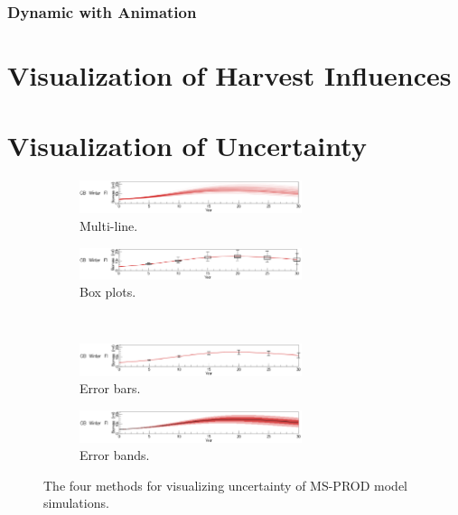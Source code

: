 \subsubsection{Dynamic with Animation}



\section{Visualization of Harvest Influences}



\section{Visualization of Uncertainty}

\begin{figure}
\centering
	\begin{subfigure}[b]{0.45\textwidth}
		\centering
		\includegraphics[width=6.5cm]{figures/eps/msprod_uncertainty_multline.eps}
		\caption{Multi-line.}
		\label{fig:uncertaintyStreak}
	\end{subfigure}	
	\begin{subfigure}[b]{0.45\textwidth}
		\centering
		\includegraphics[width=6.5cm]{figures/eps/msprod_uncertainty_boxplots.eps}
		\caption{Box plots.}
		\label{fig:uncertaintyBoxplots}
	\end{subfigure} \\
	\begin{subfigure}[b]{0.45\textwidth}
		\centering
		\includegraphics[width=6.5cm]{figures/eps/msprod_uncertainty_errorbar.eps}
		\caption{Error bars.}
		\label{fig:uncertaintyErrorbars}
	\end{subfigure}
	\begin{subfigure}[b]{0.45\textwidth}
		\centering
		\includegraphics[width=6.5cm]{figures/eps/msprod_uncertainty_errorbands.eps}
		\caption{Error bands.}
		\label{fig:uncertaintyErrorbands}
	\end{subfigure}
	\caption{The four methods for visualizing uncertainty of MS-PROD model simulations.}
	\label{fig:uncertainty}
\end{figure}

